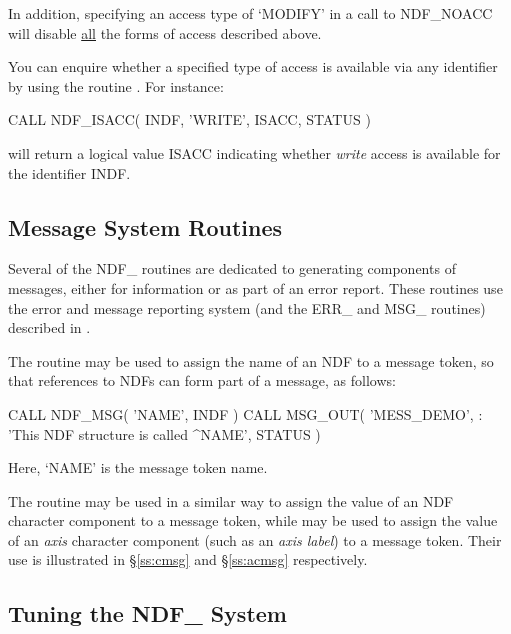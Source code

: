 \documentclass[twoside,11pt,nolof]{starlink}
\providecommand{\st}[1]{{\emph{#1}}}
\begin{document}
In addition, specifying an access type of `MODIFY' in a call to NDF\_NOACC
will disable \underline{all} the forms of access described above.

You can enquire whether a specified type of access is available via any
identifier by using the routine .
For instance:

\small
\begin{terminalv}
      CALL NDF_ISACC( INDF, 'WRITE', ISACC, STATUS )
\end{terminalv}
\normalsize

will return a logical value ISACC indicating whether \st{write\/} access is
available for the identifier INDF.

\subsection{Message System Routines}

Several of the NDF\_ routines are dedicated to generating components
of messages, either for information or as part of an error report.
These routines use the error and message reporting system (and the
ERR\_ and MSG\_ routines) described in .

The routine  may be used to assign the name of an NDF to a message
token, so that references to NDFs can form part of a message, as follows:

\small
\begin{terminalv}
      CALL NDF_MSG( 'NAME', INDF )
      CALL MSG_OUT( 'MESS_DEMO',
     :              'This NDF structure is called ^NAME', STATUS )
\end{terminalv}
\normalsize

Here, `NAME' is the message token name.

The routine  may be used in a similar way to assign the value of an
NDF character component to a message token, while  may be used to
assign the value of an \st{axis\/} character component (such as an
\st{axis label\/}) to a message token.
Their use is illustrated in \S\ref{ss:cmsg} and \S\ref{ss:acmsg}
respectively.

\subsection{\label{ss:tuning}Tuning the NDF\_ System}
\end{document}
